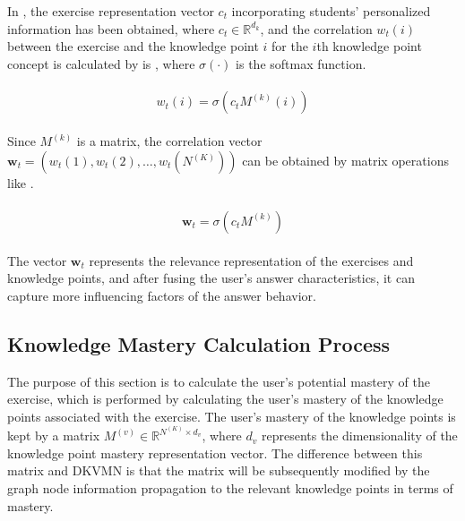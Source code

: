 In \eqname{\ref{fml:ch3-sbcap}}, the exercise representation vector \(c_t\) incorporating students' personalized information has been obtained, where \(c_t\in\mathbb{R}^{d_k}\), and the correlation \(w_t(i)\) between the exercise and the knowledge point \(i\) for the \(i\)th knowledge point concept is calculated by is \eqname{\ref{fml:ch3-corkq}}, where \(\sigma(\cdot)\) is the softmax function.

\begin{align}\label{fml:ch3-corkq}
    \begin{split}
        w_t(i)=\sigma(c_t M^{(k)}(i))
    \end{split}
\end{align}

Since \(M^{(k)}\) is a matrix, the correlation vector \(\mathbf{w}_t=(w_t(1),w_t(2),\ldots,w_t(N^{(K)}))\) can be obtained by matrix operations like \eqname{\ref{fml:ch3-corkq-mat}}.

\begin{align}\label{fml:ch3-corkq-mat}
    \begin{split}
        \mathbf{w}_t=\sigma(c_t M^{(k)})
    \end{split}
\end{align}

The vector \(\mathbf{w}_t\) represents the relevance representation of the exercises and knowledge points, and after fusing the user's answer characteristics, it can capture more influencing factors of the answer behavior.

\subsection{Knowledge Mastery Calculation Process}

The purpose of this section is to calculate the user's potential mastery of the exercise, which is performed by calculating the user's mastery of the knowledge points associated with the exercise. The user's mastery of the knowledge points is kept by a matrix \(M^{(v)}\in\mathbb{R}^{N^{(K)}\times d_v}\), where \(d_v\) represents the dimensionality of the knowledge point mastery representation vector. The difference between this matrix and DKVMN is that the matrix will be subsequently modified by the graph node information propagation to the relevant knowledge points in terms of mastery.

